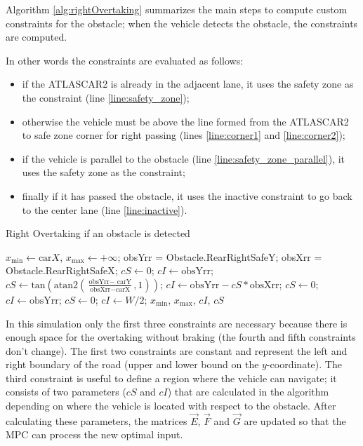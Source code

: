Algorithm \ref{alg:rightOvertaking} summarizes the main steps to compute custom constraints for the obstacle; when the vehicle detects the obstacle, the constraints are computed.

In other words the constraints are evaluated as follows:
\begin{itemize}
	\item if the ATLASCAR2 is already in the adjacent lane, it uses the safety zone as the constraint (line \ref{line:safety_zone});
	\item otherwise the vehicle must be above the line formed from the ATLASCAR2 to safe zone corner for right passing (lines \ref{line:corner1} and \ref{line:corner2});
	\item if the vehicle is parallel to the obstacle (line \ref{line:safety_zone_parallel}), it  uses the safety zone as the constraint;
	\item finally if it has passed the obstacle, it uses the inactive constraint to go back to the center lane (line \ref{line:inactive}).
\end{itemize}

\begin{algorithm}[!h]
	\caption{Right Overtaking if an obstacle is detected}
	\small
	\begin{algorithmic}[1]
		\State $x_\text{min} \gets \text{car}X $,  $x_\text{max} \gets +\infty$;
		\State obsYrr = Obstacle.RearRightSafeY;
		\State obsXrr = Obstacle.RearRightSafeX;
		\State $cS \gets 0$; $cI \gets \text{obsYrr}$; \label{line:safety_zone}
		\Else
		\State $cS \gets \text{tan}(\text{atan2}(\frac{\text{obsYrr}-\text{ carY}}{\text{obsXrr}-\text{carX}},1))$; \label{line:corner1}
		\State $cI \gets \text{obsYrr}-cS*\text{obsXrr}$;\label{line:corner2}
		\EndIf
		\Else
		\State $cS \gets 0$; $cI \gets \text{obsYrr}$;\label{line:safety_zone_parallel}
		\Else
		\State $cS \gets 0$; $cI \gets W/2$;\label{line:inactive}
		\EndIf
		\EndIf
		\State \Return $x_\text{min}$, $x_\text{max}$, $cI$, $cS$
		\State {}
		\EndFunction
	\end{algorithmic}
	\label{alg:rightOvertaking}
\end{algorithm}

In this simulation only the first three constraints are necessary because there is enough space for the overtaking without braking (the fourth and fifth constraints don't change). The first two constraints are constant and represent the left and right boundary of the road (upper and lower bound on the $y$-coordinate). The third constraint is useful to define a region where the vehicle can navigate; it consists of two parameters ($cS$ and $cI$) that are calculated in the algorithm depending on where the vehicle is located with respect to the obstacle. After calculating these parameters, the matrices $\vec{E}$, $\vec{F}$ and $\vec{G}$ are updated so that the MPC can process the new optimal input. 

